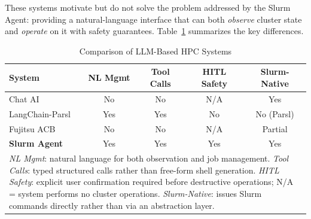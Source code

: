 These systems motivate but do not solve the problem addressed by the Slurm Agent: providing a natural-language interface that can both \emph{observe} cluster state and \emph{operate} on it with safety guarantees. Table~\ref{tab:llm-hpc-comparison} summarizes the key differences.

\begin{table}[H]
    \centering
    \caption{Comparison of LLM-Based HPC Systems}
    \label{tab:llm-hpc-comparison}
    \begin{tabular}{|l|c|c|c|c|}
        \hline
        \textbf{System} & \textbf{NL Mgmt} & \textbf{Tool Calls} & \textbf{HITL Safety} & \textbf{Slurm-Native} \\
        \hline
        Chat AI & No & No & N/A & Yes \\
        LangChain-Parsl & Yes & Yes & No & No (Parsl) \\
        Fujitsu ACB & No & No & N/A & Partial \\
        \textbf{Slurm Agent} & Yes & Yes & Yes & Yes \\
        \hline
        \multicolumn{5}{|p{\dimexpr\linewidth-2\tabcolsep-2\arrayrulewidth}|}{\footnotesize\textit{NL Mgmt}: natural language for both observation and job management. \textit{Tool Calls}: typed structured calls rather than free-form shell generation. \textit{HITL Safety}: explicit user confirmation required before destructive operations; N/A = system performs no cluster operations. \textit{Slurm-Native}: issues Slurm commands directly rather than via an abstraction layer.} \\
        \hline
    \end{tabular}
\end{table}


